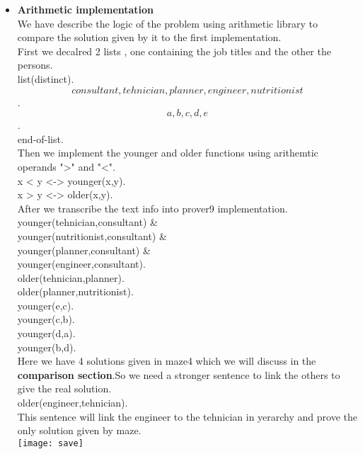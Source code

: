 \begin{itemize}
\item{\textbf{Arithmetic implementation}}\\
	\tab We have describe the logic of the problem using arithmetic library to compare the solution given by it to the first implementation.\\
	\tab First we decalred 2 lists , one containing the job titles and the other the persons.\\
		list(distinct).\\
		\[consultant,tehnician,planner,engineer,nutritionist\].\\
		\[a,b,c,d,e\].\\
		end-of-list.\\
	\tab Then we implement the younger and older functions using arithemtic operands ">" and "<".\\
		x < y <-> younger(x,y).\\
		x > y <-> older(x,y).\\
	\tab After we transcribe the text info into prover9 implementation.\\
		younger(tehnician,consultant) \&\\ 
		younger(nutritionist,consultant) \&\\
		younger(planner,consultant) \& \\
		younger(engineer,consultant).\\

		older(tehnician,planner).\\
		older(planner,nutritionist).\\

		younger(e,c).\\
		younger(c,b).\\
		younger(d,a).\\
		younger(b,d).\\
	\tab Here we have 4 solutions given in maze4 which we will discuss in the \textbf{comparison section}.So we need a stronger sentence to link the others to give the real solution.\\ 
		older(engineer,tehnician).\\
	\tab This sentence will link the engineer to the tehnician in yerarchy and prove the only solution given by maze.\\		 
	\texttt{[image: save]}\\
\end{itemize}


